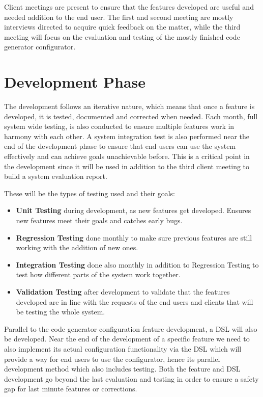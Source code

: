 Client meetings are present to ensure that the features developed are useful and needed addition to the end user. The first and second meeting are mostly interviews directed to acquire quick feedback on the matter, while the third meeting will focus on the evaluation and testing of the mostly finished code generator configurator.

\section{Development Phase}
\label{sec:dev_plan_dev}

The development follows an iterative nature, which means that once a feature is developed, it is tested, documented and corrected when needed. Each month, full system wide testing, is also conducted to ensure multiple features work in harmony with each other. A system integration test is also performed near the end of the development phase to ensure that end users can use the system effectively and can achieve goals unachievable before. This is a critical point in the development since it will be used in addition to the third client meeting to build a system evaluation report.

These will be the types of testing used and their goals:

\begin{itemize}
	\item \textbf{Unit Testing} during development, as new features get developed. Ensures new features meet their goals and catches early bugs.
	\item \textbf{Regression Testing} done monthly to make sure previous features are still working with the addition of new ones.
	\item \textbf{Integration Testing} done also monthly in addition to Regression Testing to test how different parts of the system work together.
	\item \textbf{Validation Testing} after development to validate that the features developed are in line with the requests of the end users and clients that will be testing the whole system.
\end{itemize}

Parallel to the code generator configuration feature development, a \gls{DSL} will also be developed. Near the end of the development of a specific feature we need to also implement its actual configuration functionality via the \gls{DSL} which will provide a way for end users to use the configurator, hence its parallel development method which also includes testing. Both the feature and \gls{DSL} development go beyond the last evaluation and testing in order to ensure a safety gap for last minute features or corrections.

